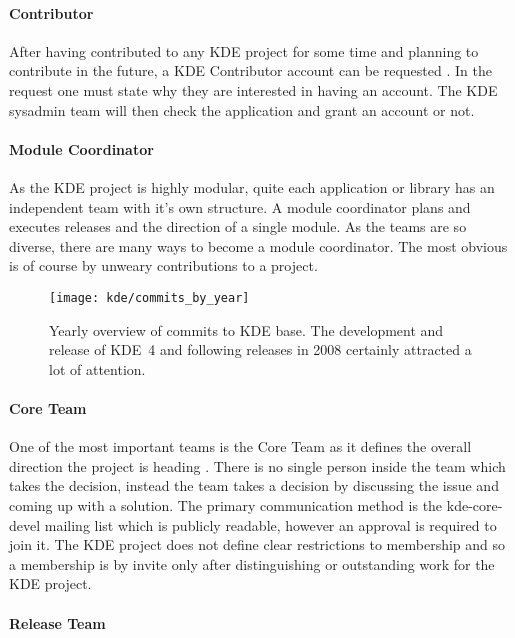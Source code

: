 \paragraph{Contributor}

After having contributed to any KDE project for some time and planning to
contribute in the future, a KDE Contributor account can be requested
\cite{KDEContribute,KDEContributor}. In the request one must state why they are
interested in having an account. The KDE sysadmin team will then check the
application and grant an account or not.

\paragraph{Module Coordinator}

As the KDE project is highly modular, quite each application or library has an
independent team with it's own structure. A module coordinator plans and
executes releases and the direction of a single module. As the teams are so
diverse, there are many ways to become a module coordinator. The most obvious
is of course by unweary contributions to a project.

\begin{figure}[htbp]
  \centering
  \texttt{[image: kde/commits\_by\_year]}
  \caption{Yearly overview of commits to KDE base. The development and release of KDE~4 and
  following releases in 2008 certainly attracted a lot of attention.}
\end{figure}

\paragraph{Core Team}

One of the most important teams is the Core Team as it defines the overall
direction the project is heading \cite{KDEProjectManagement}. There is no
single person inside the team which takes the decision, instead the team takes
a decision by discussing the issue and coming up with a solution. The primary
communication method is the kde-core-devel mailing list which is publicly
readable, however an approval is required to join it. The KDE project does not
define clear restrictions to membership and so a membership is by invite only
after distinguishing or outstanding work for the KDE project.

\paragraph{Release Team}

